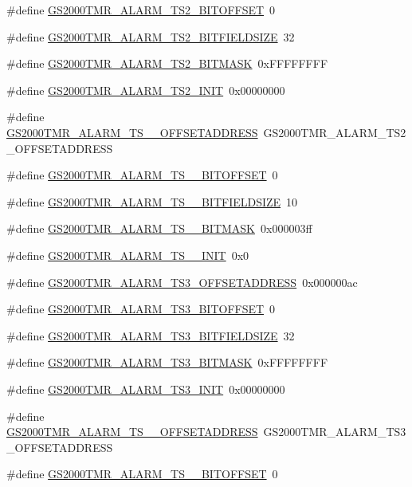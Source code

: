 \begin{DoxyCompactItemize}
\item 
\#define \hyperlink{a00556_aa6e465405788271c0fb10ab77c401ab1}{GS2000TMR\_\-ALARM\_\-TS2\_\-BITOFFSET}~0
\item 
\#define \hyperlink{a00556_ae7abd4587b009c30a97cc63f99161b16}{GS2000TMR\_\-ALARM\_\-TS2\_\-BITFIELDSIZE}~32
\item 
\#define \hyperlink{a00556_a898871269765d1b25c1bdcda243155b1}{GS2000TMR\_\-ALARM\_\-TS2\_\-BITMASK}~0xFFFFFFFF
\item 
\#define \hyperlink{a00556_a7e179bfc8493158f74f37fcdc3b8dbf4}{GS2000TMR\_\-ALARM\_\-TS2\_\-INIT}~0x00000000
\item 
\#define \hyperlink{a00556_af2058bdada06a843f5e49d87109b8182}{GS2000TMR\_\-ALARM\_\-TS\_\_\-OFFSETADDRESS}~GS2000TMR\_\-ALARM\_\-TS2\_\-OFFSETADDRESS
\item 
\#define \hyperlink{a00556_a22ab57b243c9342484edc7c1a28b8a97}{GS2000TMR\_\-ALARM\_\-TS\_\_\-BITOFFSET}~0
\item 
\#define \hyperlink{a00556_a3c80a2937ff84e263d1b993f3625f42a}{GS2000TMR\_\-ALARM\_\-TS\_\_\-BITFIELDSIZE}~10
\item 
\#define \hyperlink{a00556_a6e3afe4966f1e05bcda72225be6237f4}{GS2000TMR\_\-ALARM\_\-TS\_\_\-BITMASK}~0x000003ff
\item 
\#define \hyperlink{a00556_a123762f658685bc2d66e73654885ffec}{GS2000TMR\_\-ALARM\_\-TS\_\_\-INIT}~0x0
\item 
\#define \hyperlink{a00556_a12b9f61f490df10d5ba48427f8aeaf24}{GS2000TMR\_\-ALARM\_\-TS3\_\-OFFSETADDRESS}~0x000000ac
\item 
\#define \hyperlink{a00556_a5ab2291a607c31eccd5105b4c0bf499e}{GS2000TMR\_\-ALARM\_\-TS3\_\-BITOFFSET}~0
\item 
\#define \hyperlink{a00556_a267125ece275c0a2c6ce5769056ceb03}{GS2000TMR\_\-ALARM\_\-TS3\_\-BITFIELDSIZE}~32
\item 
\#define \hyperlink{a00556_a6c6ddb5d1ed682458f7bed6da3b13d45}{GS2000TMR\_\-ALARM\_\-TS3\_\-BITMASK}~0xFFFFFFFF
\item 
\#define \hyperlink{a00556_a603b83dbce4d79f51745c8204e8871a7}{GS2000TMR\_\-ALARM\_\-TS3\_\-INIT}~0x00000000
\item 
\#define \hyperlink{a00556_a8b6248c3f7e40a88f3cf0a903aa051a3}{GS2000TMR\_\-ALARM\_\-TS\_\_\-OFFSETADDRESS}~GS2000TMR\_\-ALARM\_\-TS3\_\-OFFSETADDRESS
\item 
\#define \hyperlink{a00556_afb61331a0c3e3fdd42d1cc55d3d8114f}{GS2000TMR\_\-ALARM\_\-TS\_\_\-BITOFFSET}~0
\item 

\end{DoxyCompactItemize}
